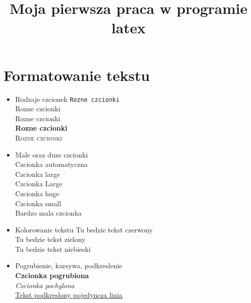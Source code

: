 \documentclass[a4paper,11pt]{article}
\title{\huge Moja pierwsza praca w programie latex}
\begin{document}
\maketitle
\tableofcontents
\newpage
\section{Formatowanie tekstu} 
\begin{itemize}
\huge \item  Rodzaje czcionek \cite{latex1} \newline
\texttt{Rozne czcionki} \\
\textmd{Rozne czcionki} \\
\textup{Rozne czcionki} \\
\textbf{Rozne czcionki} \\
\textsc{Rozne czcionki} \\
\huge \item  Male oraz duze czcionki \newline
\\

\normalsize Czcionka automatyczna \newline \\
\large Czcionka large  \newline \\
\Large Czcionka Large  \newline \\
\huge Czcionka huge  \newline \\ 
\small Czcionka small  \newline \\
\tiny Bardzo mala czcionka \newline \\



\huge \item  Kolorowanie tekstu \newline \large
{\color{red} Tu bedzie tekst czerwony} \\
{\color{green} Tu bedzie tekst zielony}\\
{\color{blue} Tu bedzie tekst niebieski}\\

\huge \item  Pogrubienie, kursywa, podkreslenie\newline \\ 
\large \textbf{Czcionka pogrubiona} \\
\textit{Czcionka pochylona}\\ 
\uline{Tekst podkreslony pojedyncza linia}\\
\\


\end{itemize}
\end{document}
